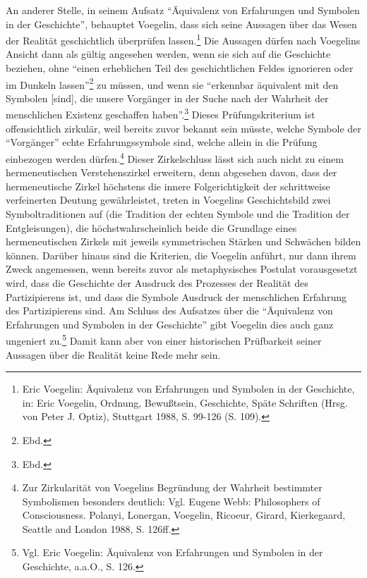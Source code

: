 
An anderer Stelle, in seinem Aufsatz "`Äquivalenz von Erfahrungen und Symbolen
in der Geschichte"', behauptet Voegelin, dass sich seine Aussagen über das
Wesen der Realität geschichtlich überprüfen lassen.\footnote{Eric Voegelin:
  Äquivalenz von Erfahrungen und Symbolen in der Geschichte, in: Eric
  Voegelin, Ordnung, Bewußtsein, Geschichte, Späte Schriften (Hrsg. von Peter
  J. Optiz), Stuttgart 1988, S. 99-126 (S. 109).} Die Aussagen dürfen nach
Voegelins Ansicht dann als gültig angesehen werden, wenn sie sich auf die
Geschichte beziehen, ohne "`einen erheblichen Teil des geschichtlichen Feldes
ignorieren oder im Dunkeln lassen"'\footnote{Ebd.} zu müssen, und wenn sie
"`erkennbar äquivalent mit den Symbolen [sind], die unsere Vorgänger in der
Suche nach der Wahrheit der menschlichen Existenz geschaffen
haben"'.\footnote{Ebd.} Dieses Prüfungskriterium ist offensichtlich zirkulär,
weil bereits zuvor bekannt sein müsste, welche Symbole der "`Vorgänger"' echte
Erfahrungssymbole sind, welche allein in die Prüfung einbezogen werden
dürfen.\footnote{Zur Zirkularität von Voegelins Begründung der Wahrheit
  bestimmter Symbolismen besonders deutlich: Vgl. Eugene Webb: Philosophers of
  Consciousness. Polanyi, Lonergan, Voegelin, Ricoeur, Girard, Kierkegaard,
  Seattle and London 1988, S. 126ff.} Dieser Zirkelschluss lässt sich auch
nicht zu einem hermeneutischen Verstehenszirkel erweitern, denn abgesehen
davon, dass der hermeneutische Zirkel höchstens die innere Folgerichtigkeit
der schrittweise verfeinerten Deutung gewährleistet, treten in Voegelins
Geschichtsbild zwei Symboltraditionen auf (die Tradition der echten Symbole
und die Tradition der Entgleisungen), die höchstwahrscheinlich beide die
Grundlage eines hermeneutischen Zirkels mit jeweils symmetrischen Stärken und
Schwächen bilden können. Darüber hinaus sind die Kriterien, die Voegelin
anführt, nur dann ihrem Zweck angemessen, wenn bereits zuvor als
metaphysisches Postulat vorausgesetzt wird, dass die Geschichte der Ausdruck
des Prozesses der Realität des Partizipierens ist, und dass die Symbole
Ausdruck der menschlichen Erfahrung des Partizipierens sind. Am Schluss des
Aufsatzes über die "`Äquivalenz von Erfahrungen und Symbolen in der
Geschichte"' gibt Voegelin dies auch ganz ungeniert zu.\footnote{Vgl. Eric
  Voegelin: Äquivalenz von Erfahrungen und Symbolen in der Geschichte, a.a.O.,
  S. 126.} Damit kann aber von einer historischen Prüfbarkeit seiner Aussagen
über die Realität keine Rede mehr sein.

